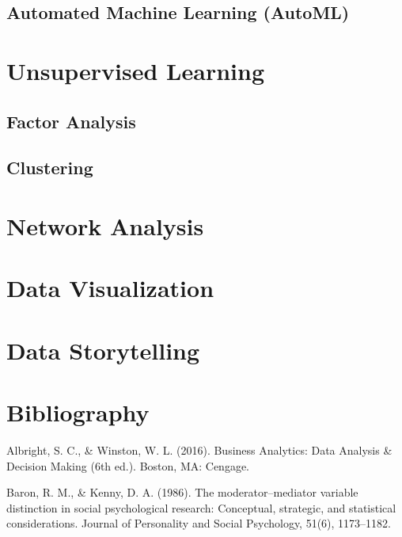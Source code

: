 \documentclass[]{book}
\begin{document}
\hypertarget{automated-machine-learning-automl}{%
\section{Automated Machine Learning (AutoML)}\label{automated-machine-learning-automl}}

\hypertarget{unsup-lrn}{%
\chapter{Unsupervised Learning}\label{unsup-lrn}}

\hypertarget{factor-analysis}{%
\section{Factor Analysis}\label{factor-analysis}}

\hypertarget{clustering}{%
\section{Clustering}\label{clustering}}

\hypertarget{net-anal}{%
\chapter{Network Analysis}\label{net-anal}}

\hypertarget{data-viz}{%
\chapter{Data Visualization}\label{data-viz}}

\hypertarget{storytelling}{%
\chapter{Data Storytelling}\label{storytelling}}

\hypertarget{bibli}{%
\chapter{Bibliography}\label{bibli}}

Albright, S. C., \& Winston, W. L. (2016). Business Analytics: Data Analysis \& Decision Making (6th ed.). Boston, MA: Cengage.

Baron, R. M., \& Kenny, D. A. (1986). The moderator--mediator variable distinction in social psychological research: Conceptual, strategic, and statistical considerations. Journal of Personality and Social Psychology, 51(6), 1173--1182.
\end{document}
